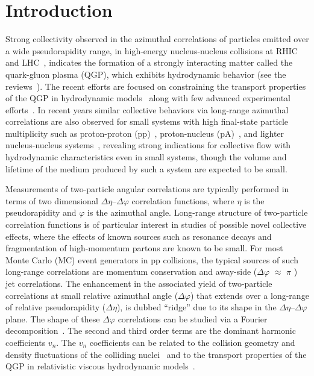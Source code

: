
\section{Introduction}
\label{sec:intro}

Strong collectivity observed in the azimuthal correlations of particles emitted over a wide pseudorapidity range, in high-energy nucleus-nucleus collisions at RHIC~\cite{Adams:2005dq,Adcox:2004mh,Arsene:2004fa,Back:2004je} and LHC~\cite{Abelev:2012di, Abelev:2014pua, ATLAS:2011ah}, indicates the formation of a strongly interacting matter called the quark-gluon plasma (QGP), which exhibits hydrodynamic behavior (see the reviews~\cite{Romatschke:2007mq,Jeon:2015dfa,Romatschke:2017ejr}). The recent efforts are focused on constraining the transport properties of the QGP in hydrodynamic models~\cite{Niemi:2015qia,Bernhard:2016tnd,Bernhard2019} along with few advanced experimental efforts~\cite{ALICE:2016kpq,Acharya:2017gsw,Acharya:2017zfg,Acharya:2020taj}.
In recent years similar collective behaviors via long-range azimuthal correlations are also observed for small systems with high final-state particle multiplicity such as proton-proton (pp)~\cite{Aad:2015gqa,Khachatryan:2015lva,Khachatryan:2016txc,Acharya:2019vdf}, proton-nucleus (pA)~\cite{Abelev:2012ola,Aad:2014lta,Aaboud:2016yar,Khachatryan:2016ibd}, and lighter nucleus-nucleus systems~\cite{PHENIX:2018lia,Aidala:2017ajz}, revealing strong indications for collective flow with hydrodynamic characteristics even in small systems, though the volume and lifetime of the medium produced by such a system are expected to be small. 

Measurements of two-particle angular correlations are typically performed in terms of two dimensional $\Delta\eta$--$\Delta\varphi$ correlation functions, where $\eta$ is the pseudorapidity and $\varphi$ is the azimuthal angle. Long-range structure of two-particle correlation functions is of particular interest in studies of possible novel collective effects, where the effects of known sources such as resonance decays and fragmentation of high-momentum partons are known to be small. For most Monte Carlo (MC) event generators in pp collisions, the typical sources of such long-range correlations are momentum conservation and away-side ($\Delta\varphi$ $\approx$ $\pi$ ) jet correlations.
The enhancement in the associated yield of two-particle correlations at small relative azimuthal angle ($\Delta\varphi$) that extends over a long-range of relative pseudorapidity ($\Delta\eta$), is dubbed ``ridge'' due to its shape in the $\Delta\eta$--$\Delta\varphi$ plane.
The shape of these $\Delta\varphi$ correlations can be studied via a Fourier decomposition~\cite{Poskanzer:1998yz,Voloshin:2008dg}. The second and third order terms are the dominant harmonic coefficients $v_n$. The $v_n$ coefficients can be related to the collision geometry and density fluctuations of the colliding nuclei~\cite{Alver:2010gr,Alver:2010dn,ALICE:2011ab} and to the transport properties of the QGP in relativistic viscous hydrodynamic models~\cite{Gale:2012rq,Niemi:2015qia,Shen:2014vra,Bernhard:2016tnd,Bernhard2019}.

